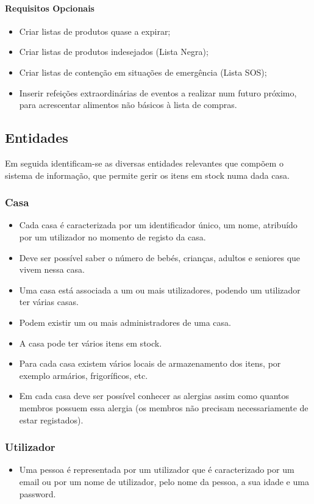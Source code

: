 \paragraph{Requisitos Opcionais}
\begin{itemize}
	\item Criar listas de produtos quase a expirar;
	\item Criar listas de produtos indesejados (Lista Negra);
	\item Criar listas de contenção em situações de emergência (Lista SOS);
	\item Inserir refeições extraordinárias de eventos a realizar num futuro próximo, para acrescentar alimentos não básicos à lista de compras.
\end{itemize}

%
%
\subsection{Entidades} \label{subsec212}

Em seguida identificam-se as diversas entidades relevantes que compõem o sistema de informação, que permite gerir os itens em stock numa dada casa.
\subsubsection{Casa}
\begin{itemize}
	\item Cada casa é caracterizada por um identificador único, um nome, atribuído por um utilizador no momento de registo da casa. 
	\item Deve ser possível saber o número de bebés, crianças, adultos e seniores que vivem nessa casa.
	\item Uma casa está associada a um ou mais utilizadores, podendo um utilizador ter várias casas. 
	\item Podem existir um ou mais administradores de uma casa.
	\item A casa pode ter vários itens em stock.
	\item Para cada casa existem vários locais de armazenamento dos itens, por exemplo armários, frigoríficos, etc.
	\item Em cada casa deve ser possível conhecer as alergias assim como quantos membros possuem essa alergia (os membros não precisam necessariamente de estar registados).
\end{itemize}

\subsubsection{Utilizador}
\begin{itemize}
	\item Uma pessoa é representada por um utilizador que é caracterizado por um email ou por um nome de utilizador, pelo nome da pessoa, a sua idade e uma password.
\end{itemize}


